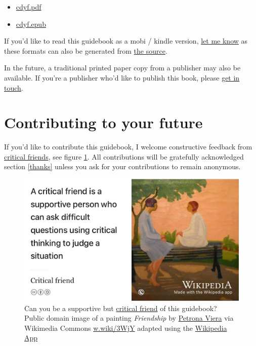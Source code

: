 \documentclass[
]{book}
\providecommand{\tightlist}{%
  \setlength{\itemsep}{0pt}\setlength{\parskip}{0pt}}
\begin{document}
\begin{itemize}
\tightlist
\item
  \href{https://www.cdyf.me/cdyf.pdf}{cdyf.pdf}
\item
  \href{https://www.cdyf.me/cdyf.epub}{cdyf.epub}
\end{itemize}

If you'd like to read this guidebook as a mobi / kindle version, \href{https://personalpages.manchester.ac.uk/staff/duncan.hull/contact.html}{let me know} as these formats can also be generated from \href{https://github.com/dullhunk/cdyf}{the source}.

In the future, a traditional printed paper copy from a publisher may also be available. If you're a publisher who'd like to publish this book, please \href{https://personalpages.manchester.ac.uk/staff/duncan.hull/contact.html}{get in touch}.

\hypertarget{contributing}{%
\section{Contributing to your future}\label{contributing}}

If you'd like to contribute this guidebook, I welcome constructive feedback from \href{https://en.wikipedia.org/wiki/Critical_friend}{critical friends}, see figure \ref{fig:critical-friend-fig}. All contributions will be gratefully acknowledged section \ref{thanks} unless you ask for your contributions to remain anonymous.

\begin{figure}

{\centering \includegraphics[width=1\linewidth]{images/critical-friend} 

}

\caption{Can you be a supportive but \href{https://en.wikipedia.org/wiki/Critical_friend}{critical friend} of this guidebook? Public domain image of a painting \emph{Friendship} by \href{https://en.wikipedia.org/wiki/Petrona_Viera}{Petrona Viera} via Wikimedia Commons \href{https://w.wiki/3WjY}{w.wiki/3WjY} adapted using the \href{https://apps.apple.com/us/app/wikipedia/id324715238}{Wikipedia App}}\label{fig:critical-friend-fig}
\end{figure}
\end{document}
